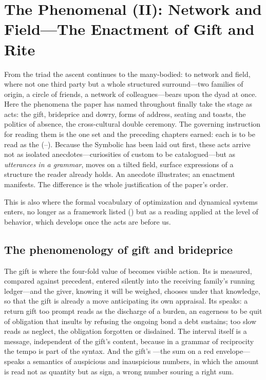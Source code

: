 \section{The Phenomenal (II): Network and Field---The Enactment of Gift and Rite}\label{p07:sec:network}

From the triad the ascent continues to the many-bodied: to network and field, where not one third party but a whole structured surround---two families of origin, a circle of friends, a network of colleagues---bears upon the dyad at once. Here the phenomena the paper has named throughout finally take the stage as acts: the gift, brideprice and dowry, forms of address, seating and toasts, the politics of absence, the cross-cultural double ceremony. The governing instruction for reading them is the one  set and the preceding chapters earned: each is to be read as the  (--). Because the Symbolic has been laid out first, these acts arrive not as isolated anecdotes---curiosities of custom to be catalogued---but as \emph{utterances in a grammar}, moves on a tilted field, surface expressions of a structure the reader already holds. An anecdote illustrates; an enactment manifests. The difference is the whole justification of the paper's order.

This is also where the formal vocabulary of optimization and dynamical systems enters, no longer as a framework listed () but as a reading applied at the level of behavior, which  develops once the acts are before us.

\subsection{The phenomenology of gift and brideprice}
The gift is where the four-fold value of  becomes visible action. Its  is measured, compared against precedent, entered silently into the receiving family's running ledger---and the giver, knowing it will be weighed, chooses under that knowledge, so that the gift is already a move anticipating its own appraisal. Its  speaks: a return gift too prompt reads as the discharge of a burden, an eagerness to be quit of obligation that insults by refusing the ongoing bond a debt sustains; too slow reads as neglect, the obligation forgotten or disdained. The interval itself is a message, independent of the gift's content, because in a grammar of reciprocity the tempo is part of the syntax. And the gift's ---the sum on a red envelope---speaks a semantics of auspicious and inauspicious numbers, in which the amount is read not as quantity but as sign, a wrong number souring a right sum.


